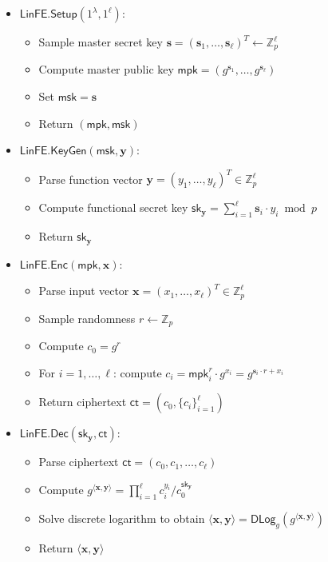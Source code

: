 \begin{itemize}
\item $\mathsf{LinFE.Setup}(1^\lambda, 1^\ell)$:
   \begin{itemize}
       \item Sample master secret key $\mathbf{s} = (\mathbf{s}_1,\ldots,\mathbf{s}_\ell)^T \leftarrow \mathbb{Z}_p^\ell$
       \item Compute master public key $\mathsf{mpk} = (g^{\mathbf{s}_1},\ldots,g^{\mathbf{s}_\ell})$
       \item Set $\mathsf{msk} = \mathbf{s}$
       \item Return $(\mathsf{mpk}, \mathsf{msk})$
   \end{itemize}

\item $\mathsf{LinFE.KeyGen}(\mathsf{msk},\mathbf{y})$:
   \begin{itemize}
       \item Parse function vector $\mathbf{y} = (y_1,\ldots,y_\ell)^T \in \mathbb{Z}_p^\ell$
       \item Compute functional secret key $\mathsf{sk}_{\mathbf{y}} = \sum_{i=1}^\ell \mathbf{s}_i \cdot y_i \bmod p$
       \item Return $\mathsf{sk}_{\mathbf{y}}$
   \end{itemize}
   
\item $\mathsf{LinFE.Enc}(\mathsf{mpk},\mathbf{x})$:
   \begin{itemize}
       \item Parse input vector $\mathbf{x} = (x_1,\ldots,x_\ell)^T \in \mathbb{Z}_p^\ell$
       \item Sample randomness $r \leftarrow \mathbb{Z}_p$
       \item Compute $c_0 = g^r$
       \item For $i = 1, \ldots, \ell$: compute $c_i = \mathsf{mpk}_i^r \cdot g^{x_i} = g^{\mathbf{s}_i \cdot r + x_i}$
       \item Return ciphertext $\mathsf{ct} = (c_0, \{c_i\}_{i=1}^\ell)$
   \end{itemize}
   
\item $\mathsf{LinFE.Dec}(\mathsf{sk}_{\mathbf{y}},\mathsf{ct})$:
   \begin{itemize}
       \item Parse ciphertext $\mathsf{ct} = (c_0, c_1,\ldots,c_\ell)$
       \item Compute $g^{\langle \mathbf{x}, \mathbf{y} \rangle} = \prod_{i=1}^\ell c_i^{y_i}/c_0^{\mathsf{sk}_{\mathbf{y}}}$
       \item Solve discrete logarithm to obtain $\langle \mathbf{x}, \mathbf{y} \rangle = \mathsf{DLog}_g(g^{\langle \mathbf{x}, \mathbf{y} \rangle})$
       \item Return $\langle \mathbf{x}, \mathbf{y} \rangle$
   \end{itemize}
\end{itemize}

